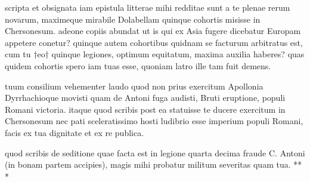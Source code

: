 


 scripta et obsignata iam epistula litterae mihi redditae sunt a te plenae rerum novarum, maximeque mirabile Dolabellam quinque cohortis misisse in Chersonesum. adeone copiis abundat ut is qui ex Asia fugere dicebatur Europam appetere conetur? quinque autem cohortibus quidnam se facturum arbitratus est, cum tu †eo† quinque legiones, optimum equitatum, maxima auxilia haberes? quas quidem cohortis spero iam tuas esse, quoniam latro ille tam fuit demens.

 tuum consilium vehementer laudo quod non prius exercitum Apollonia Dyrrhachioque movisti quam de Antoni fuga audisti, Bruti eruptione, populi Romani victoria. itaque quod scribis post ea statuisse te ducere exercitum in Chersonesum nec pati sceleratissimo hosti ludibrio esse imperium populi Romani, facis ex tua dignitate et ex re publica.

 quod scribis de seditione quae facta est in legione quarta decima fraude C. Antoni (in bonam partem accipies), magis mihi probatur militum severitas quam tua. ** *
